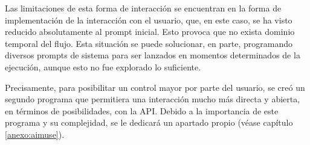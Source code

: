 Las limitaciones de esta forma de interacción se encuentran en la forma de implementación de la interacción con el usuario, que, en este caso, se ha visto reducido absolutamente al prompt inicial. Esto provoca que no exista dominio temporal del flujo. Esta situación se puede solucionar, en parte, programando diversos prompts de sistema para ser lanzados en momentos determinados de la ejecución, aunque esto no fue explorado lo suficiente.

Precisamente, para posibilitar un control mayor por parte del usuario, se creó un segundo programa que permitiera una interacción mucho más directa y abierta, en términos de posibilidades, con la API. Debido a la importancia de este programa y su complejidad, se le dedicará un apartado propio (véase capítulo \ref{anexo:aimuse}).








